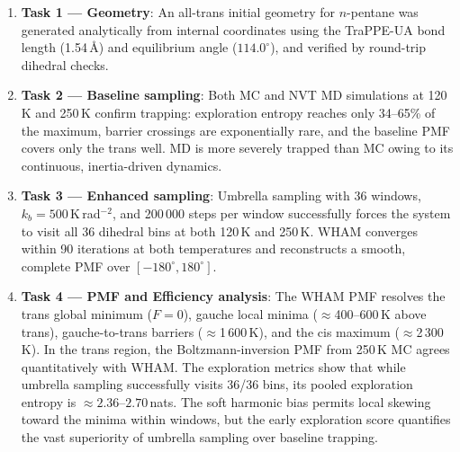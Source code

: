 \documentclass[12pt,a4paper]{article}
\begin{document}
\begin{enumerate}
  \item \textbf{Task 1 --- Geometry}: An all-trans initial geometry for
        $n$-pentane was generated analytically from internal coordinates
        using the TraPPE-UA bond length (1.54\,\AA) and equilibrium angle
        ($114.0^{\circ}$), and verified by round-trip dihedral checks.

  \item \textbf{Task 2 --- Baseline sampling}: Both MC and NVT MD simulations
        at 120\,K and 250\,K confirm trapping: exploration entropy reaches
        only 34--65\% of the maximum, barrier crossings are exponentially
        rare, and the baseline PMF covers only the trans well.  MD is more
        severely trapped than MC owing to its continuous, inertia-driven
        dynamics.

  \item \textbf{Task 3 --- Enhanced sampling}: Umbrella sampling with 36
        windows, $k_b = 500$\,K\,rad$^{-2}$, and 200\,000 steps per window
        successfully forces the system to visit all 36 dihedral bins at
        both 120\,K and 250\,K. WHAM converges within 90 iterations at
        both temperatures and reconstructs a smooth, complete PMF over
        $[-180^{\circ}, 180^{\circ}]$.

  \item \textbf{Task 4 --- PMF and Efficiency analysis}: The WHAM PMF
        resolves the trans global minimum ($F = 0$), gauche local minima
        ($\approx$400--600\,K above trans), gauche-to-trans barriers
        ($\approx$1\,600\,K), and the cis maximum ($\approx$2\,300\,K).
        In the trans region, the Boltzmann-inversion PMF from 250\,K MC
        agrees quantitatively with WHAM.  The exploration metrics show
        that while umbrella sampling successfully visits 36/36 bins, its
        pooled exploration entropy is $\approx 2.36$--$2.70$\,nats. The soft harmonic
        bias permits local skewing toward the minima within windows, but the
        early exploration score quantifies the vast superiority of umbrella
        sampling over baseline trapping.
\end{enumerate}
\end{document}
